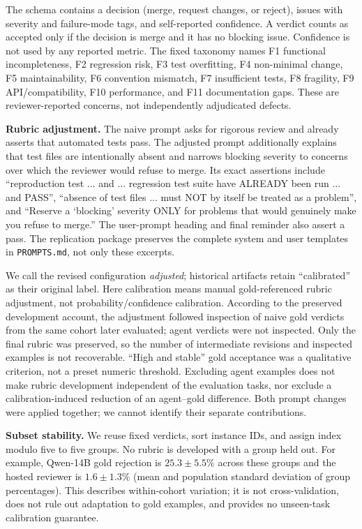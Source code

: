 \documentclass[10pt,conference]{IEEEtran}
\begin{document}
The schema contains a decision (merge, request changes, or reject), issues with severity and
failure-mode tags, and self-reported confidence. A verdict counts as accepted only if the
decision is merge and it has no blocking issue. Confidence is not used by any reported
metric. The fixed taxonomy names F1 functional incompleteness, F2 regression risk, F3 test
overfitting, F4 non-minimal change, F5 maintainability, F6 convention mismatch, F7 insufficient
tests, F8 fragility, F9 API/compatibility, F10 performance, and F11 documentation gaps. These
are reviewer-reported concerns, not independently adjudicated defects.

\textbf{Rubric adjustment.} The naive prompt asks for rigorous review and already asserts
that automated tests pass. The adjusted prompt additionally explains that test files are
intentionally absent and narrows blocking severity to concerns over which the reviewer
would refuse to merge. Its exact assertions include ``reproduction test ... and ...
regression test suite have ALREADY been run ... and PASS'', ``absence of test files ...
must NOT by itself be treated as a problem'', and ``Reserve a `blocking' severity ONLY
for problems that would genuinely make you refuse to merge.'' The user-prompt heading and
final reminder also assert a pass. The replication package preserves the complete system
and user templates in \texttt{PROMPTS.md}, not only these excerpts.

We call the revised configuration \emph{adjusted}; historical artifacts retain
``calibrated'' as their original label. Here calibration means manual gold-referenced
rubric adjustment, not
probability/confidence calibration. According to the preserved development account, the
adjustment followed inspection of naive gold verdicts from the same cohort later evaluated;
agent verdicts were not inspected. Only the final rubric was preserved, so the number of
intermediate revisions and inspected examples is not recoverable. ``High and stable'' gold
acceptance was a qualitative criterion, not a preset numeric threshold. Excluding agent
examples does not make rubric development independent of the evaluation tasks, nor exclude
a calibration-induced reduction of an agent--gold difference. Both prompt changes were
applied together; we cannot identify their separate contributions.

\textbf{Subset stability.} We reuse fixed verdicts, sort instance IDs, and assign index
modulo five to five groups. No rubric is developed with a group held out. For example,
Qwen-14B gold rejection is $25.3\pm5.5\%$ across these groups and the hosted reviewer is
$1.6\pm1.3\%$ (mean and population standard deviation of group percentages). This describes
within-cohort variation; it is not cross-validation, does not rule out adaptation to gold
examples, and provides no unseen-task calibration guarantee.
\end{document}
